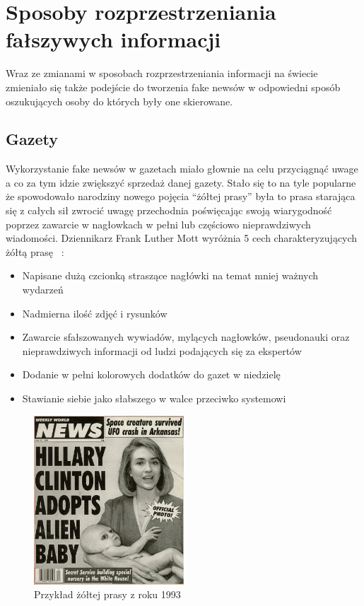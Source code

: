 \section{Sposoby rozprzestrzeniania fałszywych informacji}
Wraz ze zmianami w sposobach rozprzestrzeniania informacji na świecie zmieniało się
także podejście do tworzenia fake newsów w odpowiedni sposób oszukujących osoby do których 
były one skierowane. 

\subsection{Gazety}
Wykorzystanie fake newsów w gazetach miało głownie na celu przyciągnąć uwage a co za 
tym idzie zwiększyć sprzedaż danej gazety. Stało się to na tyle popularne że spowodowało
narodziny nowego pojęcia ``żółtej prasy'' była to prasa starająca się z całych sił zwrocić
uwagę przechodnia poświęcając swoją wiarygodność poprzez zawarcie w nagłowkach w pełni lub
częściowo nieprawdziwych wiadomości. Dziennikarz Frank Luther Mott wyróżnia 5 cech charakteryzujących 
żółtą prasę ~\cite{YellowPressFrank}:
\begin{itemize}
    \item Napisane dużą czcionką straszące nagłówki na temat mniej ważnych wydarzeń
    \item Nadmierna ilość zdjęć i rysunków
    \item Zawarcie sfałszowanych wywiadów, mylących nagłowków, pseudonauki oraz nieprawdziwych informacji od ludzi podających się za ekspertów
    \item Dodanie w pełni kolorowych dodatków do gazet w niedzielę
    \item Stawianie siebie jako słabszego w walce przeciwko systemowi
\end{itemize}

\begin{figure}[h!]
    \centering
    \includegraphics[width=0.5\textwidth]{./Img/fake-newspaper.jpg}
    \caption{Przykład żółtej prasy z roku 1993}
\end{figure}

